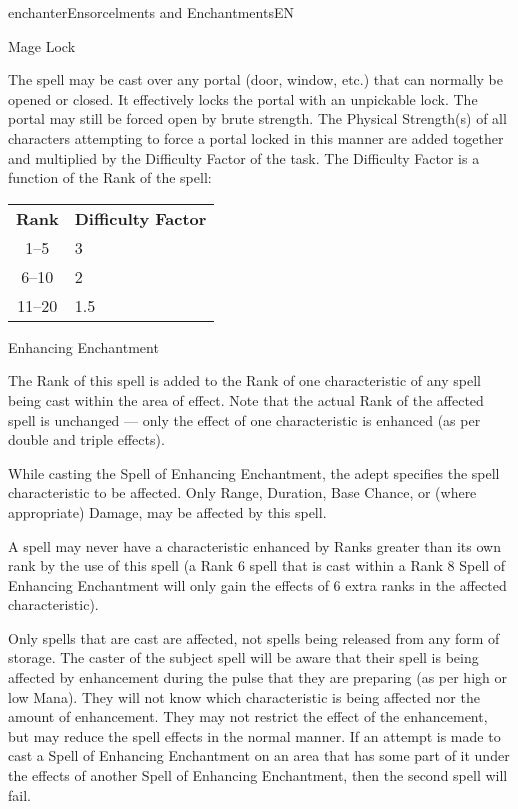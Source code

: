 \begin{college}[1.1]{enchanter}{Ensorcelments and Enchantments}{EN}
\begin{spell}[S-6]{Mage Lock}

\begin{effects}
The spell may be cast over any portal (door, window, etc.) that
can normally be opened or closed. It effectively locks the portal
with an unpickable lock. The portal may still be forced open by
brute strength. The Physical Strength(s) of all characters attempting
to force a portal locked in this manner are added together and
multiplied by the Difficulty Factor of the task. The Difficulty
Factor is a function of the Rank of the spell:

\begin{tabular}{cl}
{\bf Rank}	& {\bf Difficulty Factor} \\
1--5		& 3 \\
6--10		& 2 \\
11--20		& 1.5 \\
\end{tabular}

\end{effects}
\end{spell}

\begin{spell}[S-7]{Enhancing Enchantment}

\begin{effects}
The Rank of this spell is added to the Rank of one characteristic of
any spell being cast within the area of effect. Note that the actual
Rank of the affected spell is unchanged --- only the effect of one
characteristic is enhanced (as per double and triple effects).

While casting the Spell of Enhancing Enchantment, the adept specifies
the spell characteristic to be affected. Only Range, Duration, Base
Chance, or (where appropriate) Damage, may be affected by this spell.

A spell may never have a characteristic enhanced by Ranks greater than
its own rank by the use of this spell (\eg a Rank 6 spell that is
cast within a Rank 8 Spell of Enhancing Enchantment will only gain the
effects of 6 extra ranks in the affected characteristic).

Only spells that are cast are affected, not spells being released from
any form of storage. The caster of the subject spell will be aware
that their spell is being affected by enhancement during the pulse
that they are preparing (as per high or low Mana). They will not know
which characteristic is being affected nor the amount of
enhancement. They may not restrict the effect of the enhancement, but
may reduce the spell effects in the normal manner. If an attempt is
made to cast a Spell of Enhancing Enchantment on an area that has some
part of it under the effects of another Spell of Enhancing
Enchantment, then the second spell will fail.


\end{effects}
\end{spell}
\end{college}
